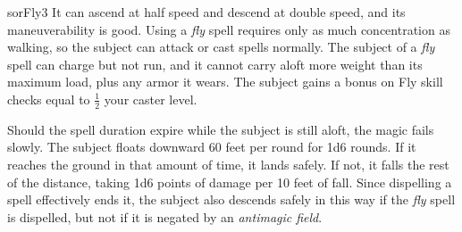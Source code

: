 \begin{spellcard}{sor}{Fly}{3}
  It can ascend at half speed and descend at double speed, and its maneuverability is good.
  Using a \emph{fly} spell requires only as much concentration as walking,
  so the subject can attack or cast spells normally.
  The subject of a \emph{fly} spell can charge but not run,
  and it cannot carry aloft more weight than its maximum load, plus any armor it wears.
  The subject gains a bonus on Fly skill checks equal to \(\frac{1}{2}\) your caster level.

  Should the spell duration expire while the subject is still aloft, the magic fails slowly.
  The subject floats downward 60 feet per round for 1d6 rounds.
  If it reaches the ground in that amount of time, it lands safely.
  If not, it falls the rest of the distance, taking 1d6 points of damage per 10 feet of fall.
  Since dispelling a spell effectively ends it,
  the subject also descends safely in this way if the \emph{fly} spell is dispelled,
  but not if it is negated by an \emph{antimagic field}.
\end{spellcard}
